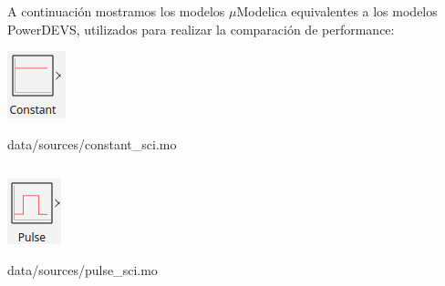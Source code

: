 A continuación mostramos los modelos $\mu$Modelica equivalentes a los modelos PowerDEVS, utilizados para realizar la comparación de performance:
\begin{listing}[H]    

\centering
\begin{minipage}{0.2\textwidth}
\includegraphics[width=0.5\linewidth]{img/constant_sci}
\end{minipage}\hfill
\begin{minipage}{0.8\textwidth}
     \caption{data/sources/constant\_sci.mo}\label{list:constant_sci.mo}
     \inputminted{modelica}{../../data/sources/constant_sci.mo}
\end{minipage}
\end{listing} 

\begin{listing}[H]    
\begin{minipage}{0.2\textwidth}
\includegraphics[width=0.5\linewidth]{img/pulse_sci}
\end{minipage}\hfill
\begin{minipage}{0.8\textwidth}
	\caption{data/sources/pulse\_sci.mo} \label{list:pulse_sci.mo}
	\inputminted{modelica}{../../data/sources/pulse_sci.mo}
\end{minipage}
\end{listing} 

